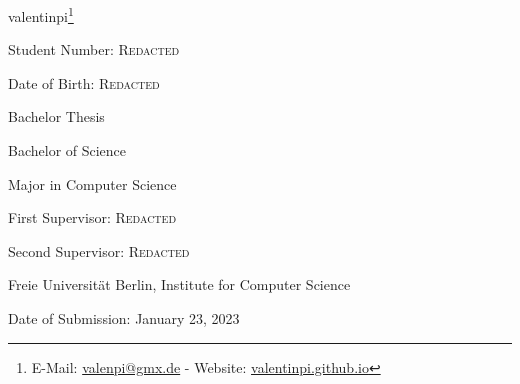 \renewcommand\footnoterule{}
\begin{titlepage}
    \thispagestyle{fancy}
    \setlength{\headheight}{12.0pt}
    \renewcommand{\headrulewidth}{0pt}

    \vspace*{\fill}
    \begin{center}
        \setlength{\fboxsep}{1em}

        \vspace{\baselineskip}

        \vspace{\baselineskip}

        \vspace{\baselineskip}

        \renewcommand{\thefootnote}{\(^\text{\varhexagon}\)}
        valentinpi\footnote{E-Mail: \href{mailto:valenpi@gmx.de}{valenpi@gmx.de} - Website: \href{https://valentinpi.github.io}{valentinpi.github.io}}
        \renewcommand{\thefootnote}{\arabic{footnote}}

        Student Number: \textsc{Redacted}

        Date of Birth: \textsc{Redacted}

        \vspace{0.5cm}

        Bachelor Thesis

        Bachelor of Science

        Major in Computer Science

        \vspace{0.5cm}

        First Supervisor: \textsc{Redacted}

        Second Supervisor: \textsc{Redacted}

        Freie Universität Berlin, Institute for Computer Science

        \vspace{0.5cm}



        Date of Submission: January 23, 2023
    \end{center}
    \vspace*{\fill}
\end{titlepage}

